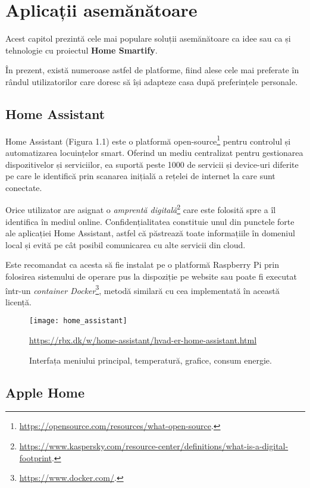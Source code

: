 \chapter{Aplicații asemănătoare}

Acest capitol prezintă cele mai populare soluții asemănătoare ca idee sau ca și tehnologie cu proiectul \textbf{Home Smartify}.

În prezent, există numeroase astfel de platforme, fiind alese cele mai preferate în rândul utilizatorilor care doresc să își adapteze casa după preferințele personale.

\section{Home Assistant}

Home Assistant (Figura 1.1) este o platformă open-source\footnote{\url{https://opensource.com/resources/what-open-source}.} pentru controlul și automatizarea locuințelor smart. Oferind un mediu centralizat pentru gestionarea dispozitivelor și serviciilor, ea suportă peste 1000 de servicii și device-uri diferite pe care le identifică prin scanarea inițială a rețelei de internet la care sunt conectate.

Orice utilizator are asignat o \emph{amprentă digitală}\footnote{\url{https://www.kaspersky.com/resource-center/definitions/what-is-a-digital-footprint}.} care este folosită spre a îl identifica în mediul online. Confidențialitatea constituie unul din punctele forte ale aplicației Home Assistant, astfel că păstrează toate informațiile în domeniul local și evită pe cât posibil comunicarea cu alte servicii din cloud. 

Este recomandat ca acesta să fie instalat pe o platformă Raspberry Pi prin folosirea sistemului de operare pus la dispoziție pe website sau poate fi executat într-un \emph{container Docker}\footnote{\url{https://www.docker.com/}.}, metodă similară cu cea implementată în această licență.

\begin{figure}[h]
	\centering
	\texttt{[image: home\_assistant]}
	\caption{Interfața meniului principal, temperatură, grafice, consum energie.}\url{https://rbx.dk/w/home-assistant/hvad-er-home-assistant.html}
	\label{fig:home_assistant}
\end{figure}

\section{Apple Home}

